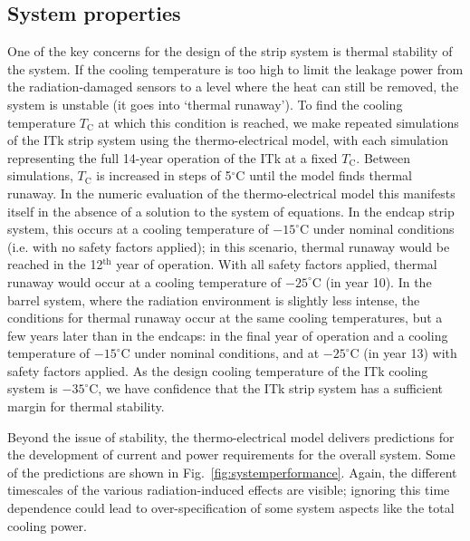 \subsection{System properties}\label{sec:systemprop}
One of the key concerns for the design of the strip system is thermal stability of the system. If the cooling temperature is too high to limit the leakage power from the radiation-damaged sensors to a level where the heat can still be removed, the system is unstable (it goes into `thermal runaway').
To find the cooling temperature $T_\text{C}$ at which this condition is reached, we make repeated simulations of the ITk strip system using the thermo-electrical model, with each simulation representing the full 14-year operation of the ITk at a fixed $T_\text{C}$. Between simulations, $T_\text{C}$ is increased in steps of 5$^\circ$C until the model finds thermal runaway. In the numeric evaluation of the thermo-electrical model this manifests itself in the absence of a solution to the system of equations. In the endcap strip system, this occurs at a cooling temperature of $-15^\circ$C under nominal conditions (i.e. with no safety factors applied); in this scenario, thermal runaway would be reached in the 12$^\text{th}$ year of operation. With all safety factors applied, thermal runaway would occur at a cooling temperature of $-25^\circ$C (in year 10).
In the barrel system, where the radiation environment is slightly less intense, the conditions for thermal runaway occur at the same cooling temperatures, but a few years later than in the endcaps: in the final year of operation and a cooling temperature of $-15^\circ$C under nominal conditions, and at $-25^\circ$C (in year 13) with safety factors applied.
As the design cooling temperature of the ITk cooling system is $-35^\circ$C, we have confidence that the ITk strip system has a sufficient margin for thermal stability.

Beyond the issue of stability, the thermo-electrical model delivers predictions for the development of current and power requirements for the overall system. Some of the predictions are shown in Fig.~\ref{fig:systemperformance}. Again, the different timescales of the various radiation-induced effects are visible; ignoring this time dependence could lead to over-specification of some system aspects like the total cooling power.

